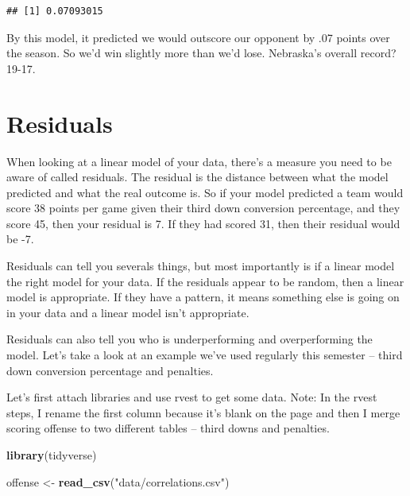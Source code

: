 \documentclass[]{book}
\newenvironment{Shaded}{\begin{snugshade}}{\end{snugshade}}
\newcommand{\KeywordTok}[1]{\textcolor[rgb]{0.13,0.29,0.53}{\textbf{#1}}}
\newcommand{\StringTok}[1]{\textcolor[rgb]{0.31,0.60,0.02}{#1}}
\newcommand{\NormalTok}[1]{#1}
\begin{document}
\begin{verbatim}
## [1] 0.07093015
\end{verbatim}

By this model, it predicted we would outscore our opponent by .07 points
over the season. So we'd win slightly more than we'd lose. Nebraska's
overall record? 19-17.

\chapter{Residuals}\label{residuals}

When looking at a linear model of your data, there's a measure you need
to be aware of called residuals. The residual is the distance between
what the model predicted and what the real outcome is. So if your model
predicted a team would score 38 points per game given their third down
conversion percentage, and they score 45, then your residual is 7. If
they had scored 31, then their residual would be -7.

Residuals can tell you severals things, but most importantly is if a
linear model the right model for your data. If the residuals appear to
be random, then a linear model is appropriate. If they have a pattern,
it means something else is going on in your data and a linear model
isn't appropriate.

Residuals can also tell you who is underperforming and overperforming
the model. Let's take a look at an example we've used regularly this
semester -- third down conversion percentage and penalties.

Let's first attach libraries and use rvest to get some data. Note: In
the rvest steps, I rename the first column because it's blank on the
page and then I merge scoring offense to two different tables -- third
downs and penalties.

\begin{Shaded}
\begin{Highlighting}[]
\KeywordTok{library}\NormalTok{(tidyverse)}
\end{Highlighting}
\end{Shaded}

\begin{Shaded}
\begin{Highlighting}[]
\NormalTok{offense <-}\StringTok{ }\KeywordTok{read_csv}\NormalTok{(}\StringTok{"data/correlations.csv"}\NormalTok{)}
\end{Highlighting}
\end{Shaded}
\end{document}
